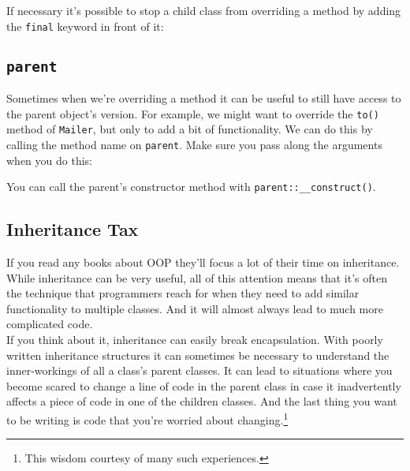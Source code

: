 \pagebreak


If necessary it's possible to stop a child class from overriding a method by adding the \texttt{final} keyword in front of it:



\subsection{\texttt{parent}}

Sometimes when we're overriding a method it can be useful to still have access to the parent object's version. For example, we might want to override the \texttt{to()} method of \texttt{Mailer}, but only to add a bit of functionality. We can do this by calling the method name on \texttt{parent}. Make sure you pass along the arguments when you do this:


You can call the parent's constructor method with \texttt{parent::\_\_construct()}.



\subsection{Inheritance Tax}


If you read any books about OOP they'll focus a lot of their time on inheritance. While inheritance can be very useful, all of this attention means that it's often the technique that programmers reach for when they need to add similar functionality to multiple classes. And it will almost always lead to much more complicated code.
\\

If you think about it, inheritance can easily break encapsulation. With poorly written inheritance structures it can sometimes be necessary to understand the inner-workings of all a class's parent classes. It can lead to situations where you become scared to change a line of code in the parent class in case it inadvertently affects a piece of code in one of the children classes. And the last thing you want to be writing is code that you're worried about changing.\footnote{This wisdom courtesy of many such experiences.}
\\

